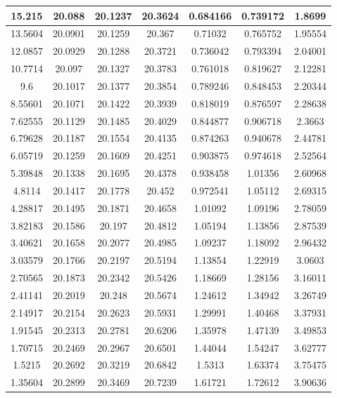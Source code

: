 \documentclass[12pt,a4paper]{article}
\begin{document}
\begin{table}[]
{\begin{tabular}{|c|c|c|c|c|c|c|}
		15.215 & 20.088 & 20.1237 & 20.3624 & 0.684166 & 0.739172 & 1.8699 \\ \hline
		13.5604 & 20.0901 & 20.1259 & 20.367 & 0.71032 & 0.765752 & 1.95554 \\ \hline
		12.0857 & 20.0929 & 20.1288 & 20.3721 & 0.736042 & 0.793394 & 2.04001 \\ \hline
		10.7714 & 20.097 & 20.1327 & 20.3783 & 0.761018 & 0.819627 & 2.12281 \\ \hline
		9.6 & 20.1017 & 20.1377 & 20.3854 & 0.789246 & 0.848453 & 2.20344 \\ \hline
		8.55601 & 20.1071 & 20.1422 & 20.3939 & 0.818019 & 0.876597 & 2.28638 \\ \hline
		7.62555 & 20.1129 & 20.1485 & 20.4029 & 0.844877 & 0.906718 & 2.3663 \\ \hline
		6.79628 & 20.1187 & 20.1554 & 20.4135 & 0.874263 & 0.940678 & 2.44781 \\ \hline
		6.05719 & 20.1259 & 20.1609 & 20.4251 & 0.903875 & 0.974618 & 2.52564 \\ \hline
		5.39848 & 20.1338 & 20.1695 & 20.4378 & 0.938458 & 1.01356 & 2.60968 \\ \hline
		4.8114 & 20.1417 & 20.1778 & 20.452 & 0.972541 & 1.05112 & 2.69315 \\ \hline
		4.28817 & 20.1495 & 20.1871 & 20.4658 & 1.01092 & 1.09196 & 2.78059 \\ \hline
		3.82183 & 20.1586 & 20.197 & 20.4812 & 1.05194 & 1.13856 & 2.87539 \\ \hline
		3.40621 & 20.1658 & 20.2077 & 20.4985 & 1.09237 & 1.18092 & 2.96432 \\ \hline
		3.03579 & 20.1766 & 20.2197 & 20.5194 & 1.13854 & 1.22919 & 3.0603 \\ \hline
		2.70565 & 20.1873 & 20.2342 & 20.5426 & 1.18669 & 1.28156 & 3.16011 \\ \hline
		2.41141 & 20.2019 & 20.248 & 20.5674 & 1.24612 & 1.34942 & 3.26749 \\ \hline
		2.14917 & 20.2154 & 20.2623 & 20.5931 & 1.29991 & 1.40468 & 3.37931 \\ \hline
		1.91545 & 20.2313 & 20.2781 & 20.6206 & 1.35978 & 1.47139 & 3.49853 \\ \hline
		1.70715 & 20.2469 & 20.2967 & 20.6501 & 1.44044 & 1.54247 & 3.62777 \\ \hline
		1.5215 & 20.2692 & 20.3219 & 20.6842 & 1.5313 & 1.63374 & 3.75475 \\ \hline
		1.35604 & 20.2899 & 20.3469 & 20.7239 & 1.61721 & 1.72612 & 3.90636 \\ \hline

\end{tabular}}
\end{table}
\end{document}
